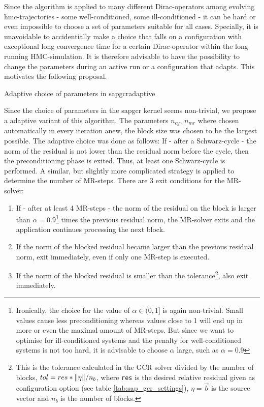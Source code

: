 \documentclass{article}
\theoremstyle{plain} %
\theoremstyle{convention} %
\theoremstyle{remark} %
\def\code#1{\texttt{#1}}
\numberwithin{equation}{section}
\begin{document}
Since the algorithm is applied to many different Dirac-operators among evolving \acrshort{hmc}-trajectories - some well-conditioned, some ill-conditioned - it can be hard or even impossible to choose a set of parameters suitable for all cases. Specially, it is unavoidable to accidentially make a choice that falls on a configuration with exceptional long convergence time for a certain Dirac-operator within the long running HMC-simulation. It is therefore advisable to have the possibility to change the parameters during an active run or a configuration that adapts. This motivates the following proposal.

\begin{proposal}{Adaptive choice of parameters in \acrshort{sapgcr}}{adaptive}

Since the choice of parameters in the \acrshort{sapgcr} kernel seems non-trivial, we propose a adaptive variant of this algorithm. The parameters $n_{cy}$, $n_{mr}$ where chosen automatically in every iteration anew, the block size was chosen to be the largest possible. The adaptive choice was done as follows: If - after a Schwarz-cycle - the norm of the residual is not lower than the residual norm before the cycle, then the preconditioning phase is exited. Thus, at least one Schwarz-cycle is performed. A similar, but slightly more complicated strategy is applied to determine the number of MR-steps. There are \num{3} exit conditions for the MR-solver:

\begin{enumerate}[label={\arabic*)}]
  \item If - after at least \num{4} MR-steps - the norm of the residual on the block is larger than $\alpha = 0.9$\footnote{Ironically, the choice for the value of $\alpha \in (0, 1]$ is again non-trivial. Small values cause less preconditioning whereas values close to \num{1} will end up in more or even the maximal amount of MR-steps. But since we want to optimise for ill-conditioned systems and the penalty for well-conditioned systems is not too hard, it is advisable to choose $\alpha$ large, such as $\alpha = 0.9$} times the previous residual norm, the MR-solver exits and the application continues processing the next block.
  \item If the norm of the blocked residual became larger than the previous residual norm, exit immediately, even if only one MR-step is executed.
  \item If the norm of the blocked residual is smaller than the tolerance\footnote{This is the tolerance calculated in the GCR solver divided by the number of blocks, $tol = res*\norm{\eta}/n_b$, where \code{res} is the desired relative residual given as configuration option (see table \ref{tab:sap_gcr_settings}), $\eta = \vec{b}$ is the source vector and $n_b$ is the number of blocks.}, also exit immediately.
\end{enumerate}


\end{proposal}
\end{document}
